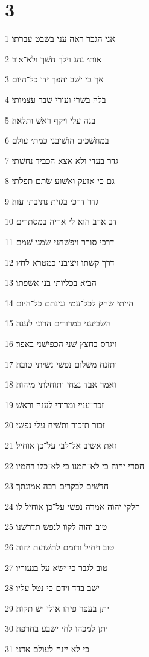 \chapter{3}

\par 1 אני הגבר ראה עני בשׁבט עברתו׃
\par 2 אותי נהג וילך חשׁך ולא־אור׃
\par 3 אך בי ישׁב יהפך ידו כל־היום׃
\par 4 בלה בשׂרי ועורי שׁבר עצמותי׃
\par 5 בנה עלי ויקף ראשׁ ותלאה׃
\par 6 במחשׁכים הושׁיבני כמתי עולם׃
\par 7 גדר בעדי ולא אצא הכביד נחשׁתי׃
\par 8 גם כי אזעק ואשׁוע שׂתם תפלתי׃
\par 9 גדר דרכי בגזית נתיבתי עוה׃
\par 10 דב ארב הוא לי אריה במסתרים׃
\par 11 דרכי סורר ויפשׁחני שׂמני שׁמם׃
\par 12 דרך קשׁתו ויציבני כמטרא לחץ׃
\par 13 הביא בכליותי בני אשׁפתו׃
\par 14 הייתי שׂחק לכל־עמי נגינתם כל־היום׃
\par 15 השׂביעני במרורים הרוני לענה׃
\par 16 ויגרס בחצץ שׁני הכפישׁני באפר׃
\par 17 ותזנח משׁלום נפשׁי נשׁיתי טובה׃
\par 18 ואמר אבד נצחי ותוחלתי מיהוה׃
\par 19 זכר־עניי ומרודי לענה וראשׁ׃
\par 20 זכור תזכור ותשׁיח עלי נפשׁי׃
\par 21 זאת אשׁיב אל־לבי על־כן אוחיל׃
\par 22 חסדי יהוה כי לא־תמנו כי לא־כלו רחמיו׃
\par 23 חדשׁים לבקרים רבה אמונתך׃
\par 24 חלקי יהוה אמרה נפשׁי על־כן אוחיל לו׃
\par 25 טוב יהוה לקוו לנפשׁ תדרשׁנו׃
\par 26 טוב ויחיל ודומם לתשׁועת יהוה׃
\par 27 טוב לגבר כי־ישׂא על בנעוריו׃
\par 28 ישׁב בדד וידם כי נטל עליו׃
\par 29 יתן בעפר פיהו אולי ישׁ תקוה׃
\par 30 יתן למכהו לחי ישׂבע בחרפה׃
\par 31 כי לא יזנח לעולם אדני׃
